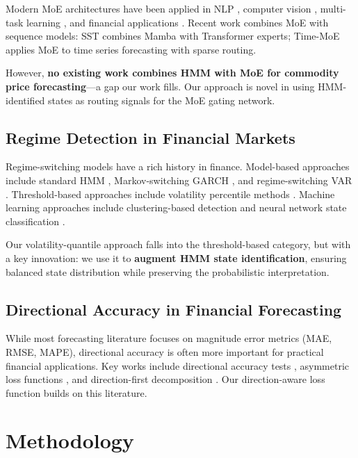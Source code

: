 \documentclass[3p,times]{elsarticle}
\begin{document}
Modern MoE architectures have been applied in NLP \cite{shazeer2017,fedus2022}, computer vision \cite{eigen2013}, multi-task learning \cite{ma2018}, and financial applications \cite{zhang2023}. Recent work combines MoE with sequence models: SST \cite{xu2024} combines Mamba with Transformer experts; Time-MoE \cite{liu2024} applies MoE to time series forecasting with sparse routing.

However, \textbf{no existing work combines HMM with MoE for commodity price forecasting}---a gap our work fills. Our approach is novel in using HMM-identified states as routing signals for the MoE gating network.

\subsection{Regime Detection in Financial Markets}

Regime-switching models have a rich history in finance. Model-based approaches include standard HMM \cite{bulla2011}, Markov-switching GARCH \cite{haas2004}, and regime-switching VAR \cite{sims2006}. Threshold-based approaches include volatility percentile methods \cite{nystrup2019}. Machine learning approaches include clustering-based detection \cite{iwaniec2019} and neural network state classification \cite{chen2020}.

Our volatility-quantile approach falls into the threshold-based category, but with a key innovation: we use it to \textbf{augment HMM state identification}, ensuring balanced state distribution while preserving the probabilistic interpretation.

\subsection{Directional Accuracy in Financial Forecasting}

While most forecasting literature focuses on magnitude error metrics (MAE, RMSE, MAPE), directional accuracy is often more important for practical financial applications. Key works include directional accuracy tests \cite{pesaran1992}, asymmetric loss functions \cite{elliott2005}, and direction-first decomposition \cite{zhang2021da}. Our direction-aware loss function builds on this literature.

\section{Methodology}
\label{sec:method}
\end{document}
